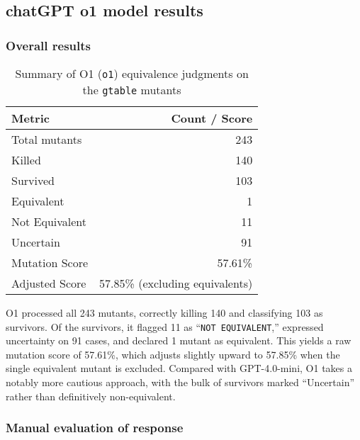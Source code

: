 \subsection{chatGPT o1 model results}

\subsubsection{Overall results}

\begin{table}[ht]
  \centering
  \begin{tabular}{lr}
    \hline\hline
    \textbf{Metric}        & \textbf{Count / Score}           \\
    \hline
    Total mutants          & 243                              \\
    Killed                 & 140                              \\
    Survived               & 103                              \\
    Equivalent             & 1                                \\
    Not Equivalent         & 11                               \\
    Uncertain              & 91                               \\
    Mutation Score         & 57.61\%                          \\
    Adjusted Score         & 57.85\% (excluding equivalents)  \\
    \hline
  \end{tabular}
  \caption{Summary of O1 (\texttt{o1}) equivalence judgments on the \texttt{gtable} mutants}
  \label{tab:o1-overall}
\end{table}

O1 processed all 243 mutants, correctly killing 140 and classifying 103 as survivors.  Of the survivors, it flagged 11 as “\texttt{NOT EQUIVALENT},” expressed uncertainty on 91 cases, and declared 1 mutant as equivalent.  This yields a raw mutation score of 57.61\%, which adjusts slightly upward to 57.85\% when the single equivalent mutant is excluded.  Compared with GPT-4.0-mini, O1 takes a notably more cautious approach, with the bulk of survivors marked “Uncertain” rather than definitively non-equivalent. 

\subsubsection{Manual evaluation of response}

